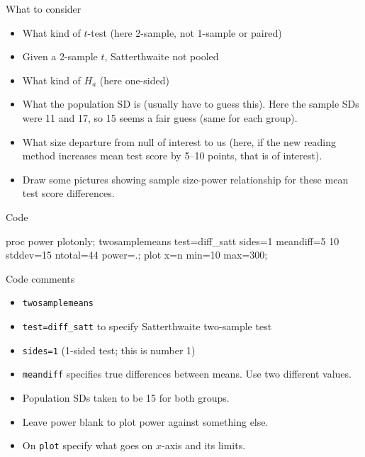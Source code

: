 \documentclass[unknownkeysallowed]{beamer}\usepackage[]{graphicx}\usepackage[]{color}
\begin{document}
\begin{frame}[fragile]{What to consider}

    \begin{itemize}
  \item What kind of $t$-test (here 2-sample, not 1-sample or paired)
  \item Given a 2-sample $t$, Satterthwaite not pooled
  \item What kind of $H_a$ (here one-sided)
  \item What the population SD is (usually have to guess this). Here
    the sample SDs were 11 and 17, so 15 seems a fair guess (same for
    each group).
  \item What size departure from null of interest to us (here, if the
    new reading method increases mean test score by 5--10 points, that
    is of interest). 
    
    \item Draw some pictures showing sample size-power relationship
      for these mean test score differences.
  \end{itemize}

\end{frame}

\begin{frame}[fragile]{Code}

    \begin{Sascode}[store=pf]
  proc power plotonly;
    twosamplemeans
      test=diff_satt
      sides=1
      meandiff=5 10
      stddev=15
      ntotal=44
      power=.;
    plot x=n min=10 max=300;
  \end{Sascode}

\end{frame}

\begin{frame}[fragile]{Code comments}
  
  \begin{itemize}
  \item \texttt{twosamplemeans}
  \item \texttt{test=diff\_satt} to specify Satterthwaite two-sample
    test
  \item \texttt{sides=1} (1-sided test; this is number 1)
  \item \texttt{meandiff} specifies true differences between
    means. Use two different values.
  \item Population SDs taken to be 15 for both groups.
  \item Leave power blank to plot power against something else.
  \item On \texttt{plot} specify what goes on $x$-axis and its limits.
  \end{itemize}
  
\end{frame}
\end{document}
